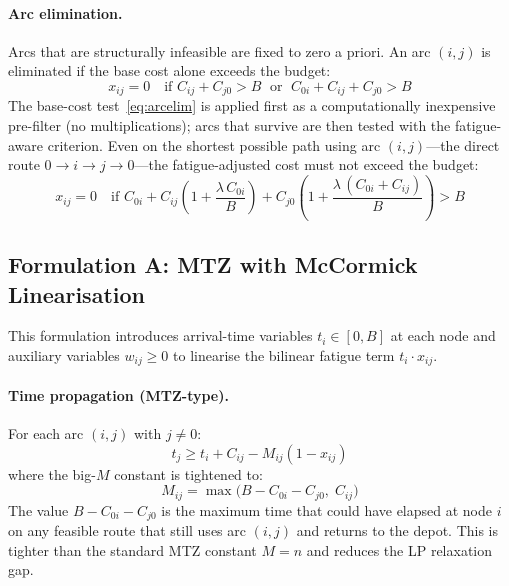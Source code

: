 \documentclass[preprint,11pt]{elsarticle}
\begin{document}
\paragraph{Arc elimination.}
Arcs that are structurally infeasible are fixed to zero a priori.
An arc $(i,j)$ is eliminated if the base cost alone exceeds the budget:
\begin{equation}
  x_{ij} = 0 \quad \text{if } C_{ij} + C_{j0} > B \;\text{ or }\; C_{0i} + C_{ij} + C_{j0} > B
  \label{eq:arcelim}
\end{equation}
The base-cost test~\eqref{eq:arcelim} is applied first as a computationally inexpensive pre-filter (no multiplications); arcs that survive are then tested with the fatigue-aware criterion.
Even on the shortest possible path using arc $(i,j)$---the direct route $0 \to i \to j \to 0$---the fatigue-adjusted cost must not exceed the budget:
\begin{equation}
  x_{ij} = 0 \quad \text{if } C_{0i} + C_{ij}\!\left(1 + \frac{\lambda\, C_{0i}}{B}\right) + C_{j0}\!\left(1 + \frac{\lambda\,(C_{0i} + C_{ij})}{B}\right) > B
  \label{eq:arcelim_fatigue}
\end{equation}

\subsection{Formulation A: MTZ with McCormick Linearisation}
\label{sec:formulation_mtz}

This formulation introduces arrival-time variables $t_i \in [0, B]$ at each node and auxiliary variables $w_{ij} \geq 0$ to linearise the bilinear fatigue term $t_i \cdot x_{ij}$.

\paragraph{Time propagation (MTZ-type).}
For each arc $(i,j)$ with $j \neq 0$:
\begin{equation}
  t_j \geq t_i + C_{ij} - M_{ij}(1 - x_{ij})
  \label{eq:mtz}
\end{equation}
where the big-$M$ constant is tightened to:
\begin{equation}
  M_{ij} = \max\bigl(B - C_{0i} - C_{j0},\; C_{ij}\bigr)
  \label{eq:bigM}
\end{equation}
The value $B - C_{0i} - C_{j0}$ is the maximum time that could have elapsed at node $i$ on any feasible route that still uses arc $(i,j)$ and returns to the depot.
This is tighter than the standard MTZ constant $M = n$ and reduces the LP relaxation gap.
\end{document}
